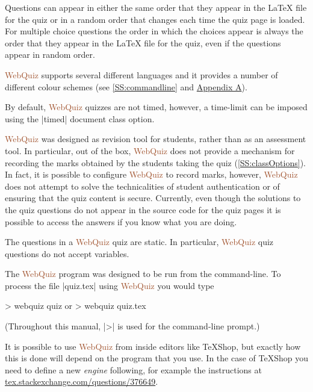 \documentclass[svgnames]{article}
\newcommand\WebQuiz{\textcolor{Sienna}{WebQuiz}\xspace}
\begin{document}
      Questions can appear in either the same order that they appear in
      the \LaTeX{} file for the quiz or in a random order that changes
      each time the quiz page is loaded. For multiple choice questions the
      order in which the choices appear is always the order that they
      appear in the \LaTeX{} file for the quiz, even if the questions
      appear in random order.

      \WebQuiz supports several different languages and it
      provides a number of different colour schemes (see
      \autoref{SS:commandline} and \hyperref[SS:themes]{Appendix A}).

      By default, \WebQuiz quizzes are not timed, however, a time-limit
      can be imposed using the \LaTeXCode|timed| document class option.

      \WebQuiz was designed as revision tool for students, rather than
      as an assessment tool. In particular, out of the box, \WebQuiz
      does not provide a mechanism for recording the marks obtained by
      the students taking the quiz (\autoref{SS:classOptions}). In fact,
      it is possible to configure \WebQuiz to record marks, however,
      \WebQuiz does not attempt to solve the technicalities of student
      authentication or of ensuring that the quiz content is secure.
      Currently, even though the solutions to the quiz questions do not
      appear in the \HTML source code for the quiz pages it is possible
      to access the answers if you know what you are doing.

      The questions in a \WebQuiz quiz are static. In particular,
      \WebQuiz quiz questions do not accept variables.

      The \WebQuiz program was designed to be run from the command-line.
      To process the file \BashCode|quiz.tex| using \WebQuiz you would
      type
      \begin{bashcode}
        > webquiz quiz         or         > webquiz quiz.tex
      \end{bashcode}
      (Throughout this manual, \BashCode|>| is used for the command-line
      prompt.)

      It is possible to use \WebQuiz from inside editors like
      \TeX Shop, but exactly how this is done will depend on the program
      that you use. In the case of \TeX Shop you need to define a
      new \textit{engine} following, for example the instructions at
      \href{https://tex.stackexchange.com/questions/376649}
           {tex.stackexchange.com/questions/376649}.
\end{document}
